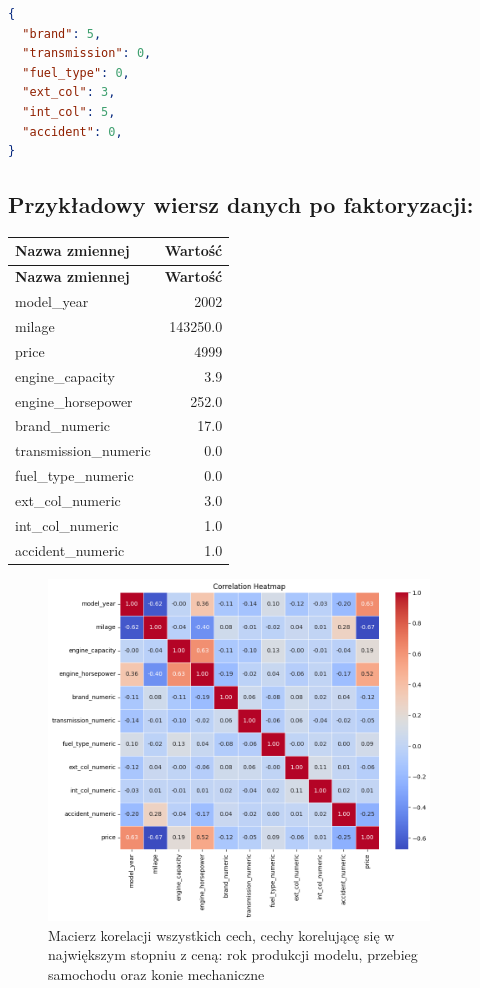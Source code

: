 \documentclass[12pt, a4paper]{report}
\begin{document}
\begin{lstlisting}[language=json, frame=single, basicstyle=\ttfamily\small, backgroundcolor=\color{lightgray}, stepnumber=1, numbersep=5pt]
{
  "brand": 5,
  "transmission": 0,
  "fuel_type": 0,
  "ext_col": 3,
  "int_col": 5,
  "accident": 0,
}
\end{lstlisting}

\subsection*{Przykładowy wiersz danych po faktoryzacji:}

\begin{longtable}{|l|r|}
\hline
\textbf{Nazwa zmiennej} & \textbf{Wartość} \\
\hline
\endfirsthead
\hline
\textbf{Nazwa zmiennej} & \textbf{Wartość} \\
\hline
\endhead
\hline
\endfoot
\hline
\endlastfoot
model\_year & 2002 \\
milage & 143250.0 \\
price & 4999 \\
engine\_capacity & 3.9 \\
engine\_horsepower & 252.0 \\
brand\_numeric & 17.0 \\
transmission\_numeric & 0.0 \\
fuel\_type\_numeric & 0.0 \\
ext\_col\_numeric & 3.0 \\
int\_col\_numeric & 1.0 \\
accident\_numeric & 1.0 \\
\end{longtable}

\begin{figure}[H]
    \centering
    \includegraphics[width=0.9\textwidth]{images/correlation_heatmap.png}
    \caption{Macierz korelacji wszystkich cech, cechy korelującę się w największym stopniu z ceną: rok produkcji modelu, przebieg samochodu oraz konie mechaniczne}
\end{figure}
\end{document}

